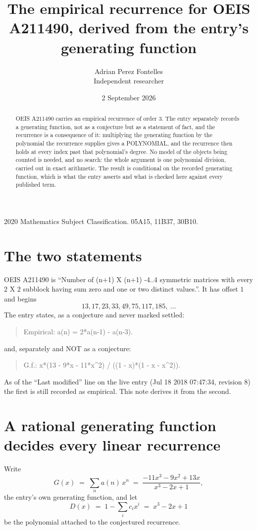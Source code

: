 \documentclass[11pt,a4paper]{article}
\title{The empirical recurrence for OEIS A211490, derived from the entry's generating function}
\author{Adrian Perez Fontelles\\ \small Independent researcher}
\date{2 September 2026}
\theoremstyle{plain}
\theoremstyle{definition}
\begin{document}
\maketitle

\begin{abstract}
OEIS A211490 carries an empirical recurrence of order $3$. The entry separately records a
generating function, not as a conjecture but as a statement of fact, and the recurrence is a
consequence of it: multiplying the generating function by the polynomial the recurrence
supplies gives a POLYNOMIAL, and the recurrence then holds at every index past that
polynomial's degree. No model of the objects being counted is needed, and no search: the
whole argument is one polynomial division, carried out in exact arithmetic. The result is
conditional on the recorded generating function, which is what the entry asserts and what is
checked here against every published term.
\end{abstract}

\noindent\small 2020 Mathematics Subject Classification. 05A15, 11B37, 30B10.\normalsize

\section{The two statements}

OEIS A211490 is ``Number of (n+1) X (n+1) -4..4 symmetric matrices with every 2 X 2 subblock having sum zero and one or two distinct values.''. It has offset $1$ and begins
\[
13, 17, 23, 33, 49, 75, 117, 185,\ \dots
\]
The entry states, as a conjecture and never marked settled:
\begin{quote}
Empirical: a(n) = 2*a(n-1) - a(n-3).
\end{quote}
and, separately and NOT as a conjecture:
\begin{quote}
G.f.: x*(13 - 9*x - 11*x\^{}2) / ((1 - x)*(1 - x - x\^{}2)).
\end{quote}
As of the ``Last modified'' line on the live entry (Jul 18 2018 07:47:34, revision 8) the first is still
recorded as empirical. This note derives it from the second.

\section{A rational generating function decides every linear recurrence}

Write
\[
G(x)\;=\;\sum_{n}a(n)\,x^{n}\;=\;\frac{- 11 x^{3} - 9 x^{2} + 13 x}{x^{3} - 2 x + 1},
\]
the entry's own generating function, and let
\[
D(x)\;=\;1-\sum_i c_i x^{i}\;=\;x^{3} - 2 x + 1
\]
be the polynomial attached to the conjectured recurrence.
\end{document}
